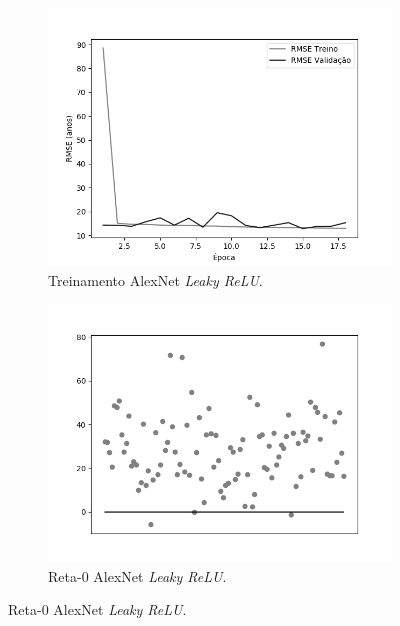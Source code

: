 \begin{figure}[ht!]
\begin{subfigure}[hb]{0.5\linewidth}
			\caption{Treinamento AlexNet \emph{Leaky ReLU}.}
			\centering
			\includegraphics[width=\linewidth]{img/graficos/history/alexnet/fig-history-image-treat-2-alexnet-lrelu-rmse.png}
		\end{subfigure}
		\begin{subfigure}[hb]{0.5\linewidth}
			\caption{Reta-0 AlexNet \emph{Leaky ReLU}.}
			\includegraphics[width=\linewidth]{img/graficos/reta0/alexnet/fig-reta-0-image-treat-2-alexnet-lrelu.png}
		\end{subfigure}%
	\end{figure}

